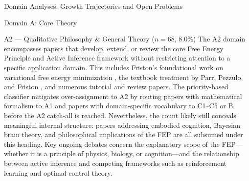 \documentclass[
  ignorenonframetext,
]{beamer}
\begin{document}
\begin{frame}{Domain Analyses: Growth Trajectories and Open Problems
\label{sec:subfield_analyses}}
\begin{block}{Domain A: Core Theory}
\begin{block}{A2 --- Qualitative Philosophy \& General Theory
(\(n = 68\), 8.0\%)}
\protect{}\label{a2-qualitative-philosophy-general-theory-n-68-8.0}
The A2 domain encompasses papers that develop, extend, or review the
core Free Energy Principle and Active Inference framework without
restricting attention to a specific application domain. This includes
Friston's foundational work on variational free energy minimization
\citep{friston2010free}, the textbook treatment by Parr, Pezzulo, and
Friston \citep{parr2022active}, and numerous tutorial and review papers.
The priority-based classifier mitigates over-assignment to A2 by routing
papers with mathematical formalism to A1 and papers with domain-specific
vocabulary to C1--C5 or B before the A2 catch-all is reached.
Nevertheless, the count likely still conceals meaningful internal
structure: papers addressing embodied cognition, Bayesian brain theory,
and philosophical implications of the FEP are all subsumed under this
heading. Key ongoing debates concern the explanatory scope of the
FEP---whether it is a principle of physics, biology, or cognition---and
the relationship between active inference and competing frameworks such
as reinforcement learning and optimal control theory.
\end{block}
\end{block}


\end{frame}
\end{document}
